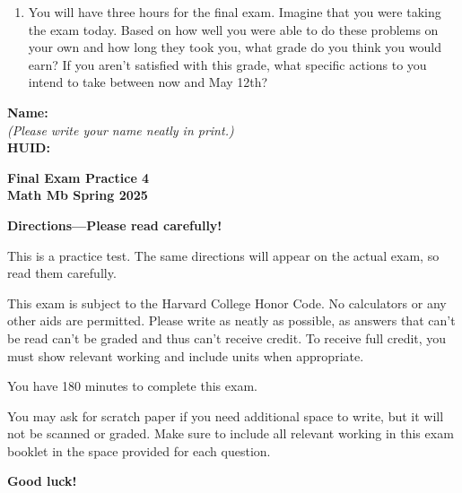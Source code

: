 \documentclass{article}
\begin{document}
{\begin{enumerate}
    \pspace{\vfill}
    
    \item You will have three hours for the final exam. Imagine that you were taking the exam today. Based on how well you were able to do these problems on your own and how long they took you, what grade do you think you would earn? If you aren't satisfied with this grade, what specific actions to you intend to take between now and May 12th?

    \pspace{\vfill}

\end{enumerate}

\newpage
}

\setcounter{page}{1}

{\large \mbox{} \hfill \bf Name:\underline{\hspace{3in}}}\\[2pt]
{\mbox{} \hfill \it (Please write your name neatly in print.)}\\[12pt]
{\large \mbox{} \hfill \bf HUID:\underline{\hspace{3in}}}
 
\medskip
 
\noindent
{\large\bf
Final Exam Practice 4\\
Math Mb Spring 2025}
\noindent


{\Large
\begin{center}\textbf{Directions---Please read carefully!} \end{center}}

This is a practice test. The same directions will appear on the actual exam, so read them carefully.

\hrulefill 


This exam is subject to the Harvard College Honor Code. No calculators or any other aids are permitted.  Please write as neatly as possible, as answers that can't be read can't be graded and thus can't receive credit. To receive full credit, you must show relevant working
and include units when appropriate. 

You have 180 minutes to complete this exam. 

You may ask for scratch paper if you need additional space to write, but it will not be scanned or graded. Make sure to include all relevant working in this exam booklet in the space provided for each question.

\begin{center}\textbf{Good luck!}\end{center}
\end{document}
